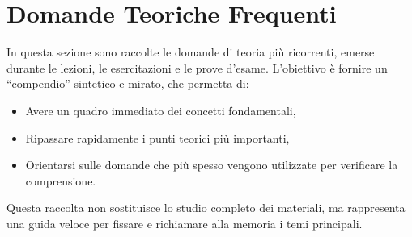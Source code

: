 \section{Domande Teoriche Frequenti}

In questa sezione sono raccolte le domande di teoria più ricorrenti, emerse durante le lezioni, le esercitazioni e le prove d'esame. L'obiettivo è fornire un ``compendio'' sintetico e mirato, che permetta di:
\begin{itemize}
    \item Avere un quadro immediato dei concetti fondamentali,
    \item Ripassare rapidamente i punti teorici più importanti,
    \item Orientarsi sulle domande che più spesso vengono utilizzate per verificare la comprensione.
\end{itemize}
Questa raccolta non sostituisce lo studio completo dei materiali, ma rappresenta una guida veloce per fissare e richiamare alla memoria i temi principali.

